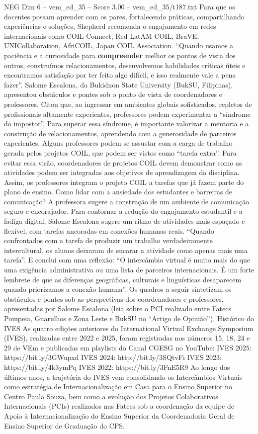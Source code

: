 \begin{textsample}{NEG Dim 6 – vem\_ed\_35 – Score 3.00 – vem\_ed\_35/t187.txt}
Para que os docentes possam aprender com os pares, fortalecendo práticas, compartilhando experiências e soluções, Shepherd recomenda o engajamento em redes internacionais como COIL Connect, Red LatAM COIL, BraVE, UNICollaboration, AfriCOIL, Japan COIL Association. “Quando usamos a paciência e a curiosidade para \textbf{compreender} melhor os pontos de vista dos outros, construímos relacionamentos, desenvolvemos habilidades críticas úteis e encontramos satisfação por ter feito algo difícil, e isso realmente vale a pena fazer”.
Salome Escalona, da Bukidnon State University (BukSU, Filipinas), apresentou obstáculos e pontes sob o ponto de vista de coordenadores e professores.
Citou que, ao ingressar em ambientes globais sofisticados, repletos de profissionais altamente experientes, professores podem experimentar a “síndrome do impostor”.
Para superar essa síndrome, é importante valorizar a mentoria e a construção de relacionamentos, aprendendo com a generosidade de parceiros experientes.
Alguns professores podem se assustar com a carga de trabalho gerada pelos projetos COIL, que podem ser vistos como “tarefa extra”.
Para evitar essa visão, coordenadores de projetos COIL devem demonstrar como as atividades podem ser integradas aos objetivos de aprendizagem da disciplina.
Assim, os professores integram o projeto COIL a tarefas que já fazem parte do plano de ensino.
Como lidar com a ansiedade dos estudantes e barreiras de comunicação?
A professora sugere a construção de um ambiente de comunicação seguro e encorajador.
Para contornar a redução do engajamento estudantil e a fadiga digital, Salome Escalona sugere um ritmo de atividades mais espaçado e flexível, com tarefas ancoradas em conexões humanas reais. “Quando confrontados com a tarefa de produzir um trabalho verdadeiramente intercultural, os alunos deixaram de encarar a atividade como apenas mais uma tarefa”.
E conclui com uma reflexão: “O intercâmbio virtual é muito mais do que uma exigência administrativa ou uma lista de parceiros internacionais.
É um forte lembrete de que as diferenças geográficas, culturais e linguísticas desaparecem quando priorizamos a conexão humana”.
Os quadros a seguir sintetizam os obstáculos e pontes sob as perspectivas dos coordenadores e professores, apresentadas por Salome Escalona (leia sobre o PCI realizado entre Fatecs Pompeia, Guarulhos e Zona Leste e BukSU no “Artigo de Opinião”).
Histórico do IVES As quatro edições anteriores do International Virtual Exchange Symposium (IVES), realizadas entre 2022 e 2025, foram registradas nos números 15, 18, 24 e 29 de VEm e publicadas em playlists do Canal CGESG no YouTube: IVES 2025: https://bit.ly/3GWupxd IVES 2024: http://bit.ly/3SQtvFi IVES 2023: https://bit.ly/4k3ymPq IVES 2022: https://bit.ly/3FnE5R9 Ao longo dos últimos anos, a trajetória do IVES vem consolidando os Intercâmbios Virtuais como estratégia de Internacionalização em Casa para o Ensino Superior no Centro Paula Souza, bem como a evolução dos Projetos Colaborativos Internacionais (PCIs) realizados nas Fatecs sob a coordenação da equipe de Apoio à Internacionalização do Ensino Superior da Coordenadoria Geral de Ensino Superior de Graduação do CPS.

\end{textsample}

